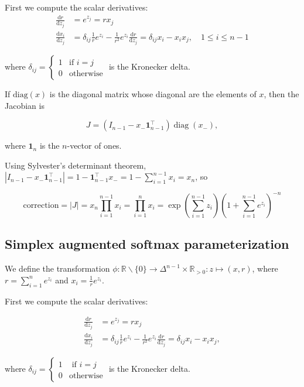 \documentclass[twoside]{article}
\begin{document}
First we compute the scalar derivatives:
$$
\begin{aligned}
    \frac{\mathrm{d} r}{\mathrm{d} z_j} &= e^{z_j} = r x_j\\
    \frac{\mathrm{d} x_i}{\mathrm{d} z_j} &= \delta_{ij} \frac{1}{r} e^{z_i} - \frac{1}{r^2} e^{z_i} \frac{\mathrm{d} r}{\mathrm{d} z_j} = \delta_{ij} x_i - x_i x_j, \quad 1 \le i \le n-1
\end{aligned}
$$

where $\delta_{ij} = \begin{cases} 1 &\text{if } i = j \\ 0 &\text{otherwise}\end{cases}$ is the Kronecker delta.

If $\mathrm{diag}(x)$ is the diagonal matrix whose diagonal are the elements of $x$, then the Jacobian is

$$J = (I_{n-1} - x_- \boldsymbol{1}_{n-1}^\top) \operatorname{diag}(x_-),$$

where $\boldsymbol{1}_n$ is the $n$-vector of ones.

Using Sylvester's determinant theorem, $|I_{n-1} - x_- \boldsymbol{1}_{n-1}^\top| = 1 - \boldsymbol{1}_{n-1}^\top x_- = 1 - \sum_{i=1}^{n-1} x_i = x_n$, so

$$\mathrm{correction} = |J| = x_n \prod_{i=1}^{n-1} x_i = \prod_{i=1}^{n} x_i = \exp\left(\sum_{i=1}^{n-1} z_i\right) \left(1 + \sum_{i=1}^{n-1} e^{z_i}\right)^{-n}$$

\subsection{Simplex augmented softmax parameterization}

We define the transformation $\phi: \mathbb{R} \backslash \{0\} \to \Delta^{n-1} \times \mathbb{R}_{>0}: z \mapsto (x, r)$,
where $r = \sum_{i=1}^n e^{z_i}$ and $x_i = \frac{1}{r} e^{z_i}$.

First we compute the scalar derivatives:

$$
\begin{aligned}
    \frac{\mathrm{d} r}{\mathrm{d} z_j} &= e^{z_j} = r x_j\\
    \frac{\mathrm{d} x_i}{\mathrm{d} z_j} &= \delta_{ij} \frac{1}{r} e^{z_i} - \frac{1}{r^2} e^{z_i} \frac{\mathrm{d} r}{\mathrm{d} z_j} = \delta_{ij} x_i - x_i x_j,
\end{aligned}
$$

where $\delta_{ij} = \begin{cases} 1 &\text{ if } i = j \\ 0 &\text{otherwise}\end{cases}$ is the Kronecker delta.
\end{document}
